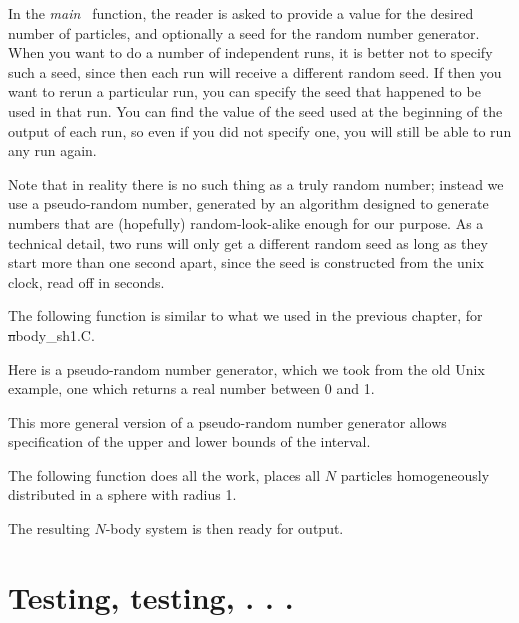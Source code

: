 In the {\it main\ } function, the reader is asked to provide a value
for the desired number of particles, and optionally a seed for the
random number generator.  When you want to do a number of independent
runs, it is better not to specify such a seed, since then each run
will receive a different random seed.  If then you want to rerun a
particular run, you can specify the seed that happened to be used in
that run.  You can find the value of the seed used at the beginning of
the output of each run, so even if you did not specify one, you will
still be able to run any run again. 

Note that in reality there is no such thing as a truly random number;
instead we use a pseudo-random number, generated by an algorithm
designed to generate numbers that are (hopefully) random-look-alike
enough for our purpose.  As a technical detail, two runs will only get
a different random seed as long as they start more than one second
apart, since the seed is constructed from the unix clock, read off in
seconds.


The following function is similar to what we used in the previous
chapter, for {\st nbody\_sh1.C}.


Here is a pseudo-random number generator, which we took from the
old Unix example, one which returns a real number between 0 and 1.


This more general version of a pseudo-random number generator allows
specification of the upper and lower bounds of the interval.


The following function does all the work, places all $N$ particles
homogeneously distributed in a sphere with radius 1.


The resulting $N$-body system is then ready for output.


\section{Testing, testing, . . .}

